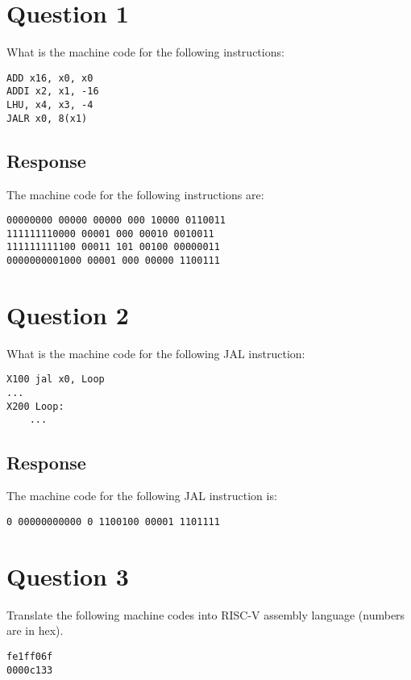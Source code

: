\documentclass{article}
\begin{document}
\section*{Question 1}
What is the machine code for the following instructions:
\begin{verbatim}
ADD x16, x0, x0
ADDI x2, x1, -16
LHU, x4, x3, -4
JALR x0, 8(x1)
\end{verbatim}

\subsection*{Response}
The machine code for the following instructions are:

\begin{verbatim}
00000000 00000 00000 000 10000 0110011
111111110000 00001 000 00010 0010011
111111111100 00011 101 00100 00000011
0000000001000 00001 000 00000 1100111
\end{verbatim}





\newpage
\section*{Question 2}
What is the machine code for the following JAL instruction:
\begin{verbatim}
X100 jal x0, Loop
...
X200 Loop:
    ...
\end{verbatim}

\subsection*{Response}
The machine code for the following JAL instruction is:
\begin{verbatim}
0 00000000000 0 1100100 00001 1101111
\end{verbatim}





\newpage
\section*{Question 3}
Translate the following machine codes into RISC-V assembly language (numbers are in hex).
\begin{verbatim}
fe1ff06f
0000c133
\end{verbatim}
\end{document}
